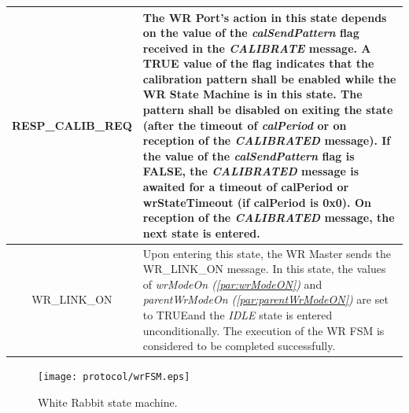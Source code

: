 \documentclass[a4paper, 12pt]{article}
\makeatletter
\renewcommand\paragraph{\@startsection{paragraph}{4}{\z@}%
                                     {-3.25ex\@plus -1ex \@minus -.2ex}%
                                     {0.0001pt \@plus .2ex}%
                                     {\normalfont\normalsize\bfseries}}
\makeatother
\begin{document}
\begin{table}[hp!]
\begin{tabular}{| c | p{12.2cm} |}
RESP\_CALIB\_REQ   &  The WR Port's action in this state depends on the value of the 
		      \textit{calSendPattern} flag received in the \textit{CALIBRATE} 
		      message. A TRUE value of the flag
		      indicates that the calibration pattern shall be enabled while the WR State 
		      Machine is in this state. The pattern shall  be
		      disabled on exiting the state (after the timeout of \textit{calPeriod} or 
		      on reception of the \textit{CALIBRATED} message). If the value of  the
		      \textit{calSendPattern} flag is FALSE, 
		      the \textit{CALIBRATED} message is awaited for a timeout of calPeriod or 
		      wrStateTimeout (if calPeriod is 0x0). On 
		      reception of the \textit{CALIBRATED} message, the next state is entered.\\
		      \hline
WR\_LINK\_ON       &  Upon entering this state, the WR Master sends the WR\_LINK\_ON message. 
		      In this state, the values of \textit{wrModeOn (\ref{par:wrModeON})} and 
		      \textit{parentWrModeOn (\ref{par:parentWrModeON})} are set to 
		      TRUE\footnotemark[6] and the \textit{IDLE}  state is entered unconditionally. 
		      The execution of the WR FSM is considered to be completed successfully. \\ \hline
\end{tabular}
\label{tab:wrFSMdesc}
\end{table}


\addtocounter{footnote}{1}

\begin{figure}[ht!]
  \centering
  \texttt{[image: protocol/wrFSM.eps]}
  \caption{White Rabbit state machine.}
  \label{fig:wrFSM}
\end{figure}



\newpage


\end{document}

